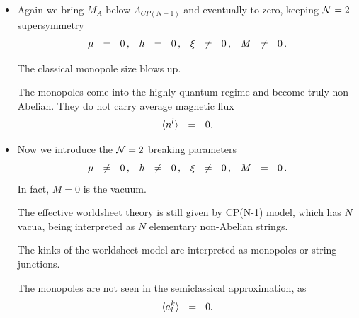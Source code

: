 \documentclass[12pt,letterpaper,landscape,KOMA,smallheadings,calcdimensions,display]{powersem}
\begin{document}
\begin{slide}
\begin{itemize}
\item
	Again we bring $ M_A $ below $ \Lambda_{CP(N-1)} $ and eventually to zero,
	keeping $ \mathcal{N}=2 $ supersymmetry
\[
	\mu ~~=~~ 0\,\text, \quad h ~~=~~ 0\,\text, \quad \xi ~~\neq~~ 0 \,\text, \quad  M ~~\neq~~ 0\,\text{.}
\]

	The classical monopole size blows up.

	The monopoles come into the highly quantum regime and become truly non-Abelian. 
	They do not carry average magnetic flux
\[
	\langle n^l \rangle ~~=~~ 0\text.
\]
	
\end{itemize}
\end{slide}

\begin{slide}
\begin{itemize}
\item
	Now we introduce the $\mathcal{N}=2$ breaking parameters
\[
	\mu ~~\neq~~ 0\,\text, \quad h ~~\neq~~ 0\,\text, \quad \xi ~~\neq~~ 0 \,\text, \quad  M ~~=~~ 0\,\text{.}
\]
	In fact, $ M = 0 $ is the vacuum.

	The effective worldsheet theory is still given by CP(N-1) model, which has $N$ vacua,
	being interpreted as $N$ elementary non-Abelian strings.

	The kinks of the worldsheet model are interpreted as monopoles or string junctions.

	The monopoles are not seen in the semiclassical approximation, as
\[
	\langle a^k_l \rangle ~~=~~ 0\text.
\]
\end{itemize}

\end{slide}
\end{document}
